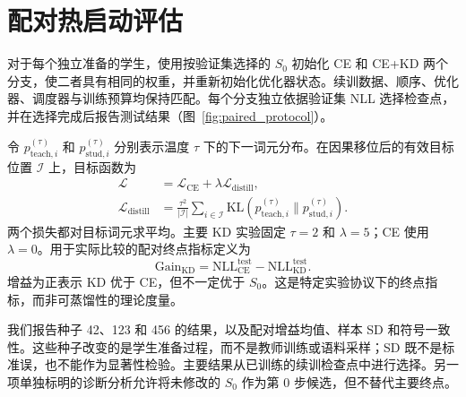\section{配对热启动评估}\label{sec:problem-setting}

对于每个独立准备的学生，使用按验证集选择的 $S_0$ 初始化 CE 和 CE+KD 两个分支，使二者具有相同的权重，并重新初始化优化器状态。续训数据、顺序、优化器、调度器与训练预算均保持匹配。每个分支独立依据验证集 NLL 选择检查点，并在选择完成后报告测试结果（图~\ref{fig:paired_protocol}）。

令 $p_{\mathrm{teach},i}^{(\tau)}$ 和 $p_{\mathrm{stud},i}^{(\tau)}$ 分别表示温度 $\tau$ 下的下一词元分布。在因果移位后的有效目标位置 $\mathcal I$ 上，目标函数为
\begin{align}
\mathcal L&=\mathcal L_{\mathrm{CE}}+\lambda\mathcal L_{\mathrm{distill}},\label{eq:kd-objective}\\
\mathcal L_{\mathrm{distill}}&=\frac{\tau^2}{|\mathcal I|}\sum_{i\in\mathcal I}
\mathrm{KL}\!\left(p_{\mathrm{teach},i}^{(\tau)}\|p_{\mathrm{stud},i}^{(\tau)}\right).\nonumber
\end{align}
两个损失都对目标词元求平均。主要 KD 实验固定 $\tau=2$ 和 $\lambda=5$；CE 使用 $\lambda=0$。用于实际比较的配对终点指标定义为
\begin{equation}
\mathrm{Gain}_{\mathrm{KD}}=\mathrm{NLL}_{\mathrm{CE}}^{\mathrm{test}}-\mathrm{NLL}_{\mathrm{KD}}^{\mathrm{test}}.
\label{eq:paired-gain}
\end{equation}
增益为正表示 KD 优于 CE，但不一定优于 $S_0$。这是特定实验协议下的终点指标，而非可蒸馏性的理论度量。

我们报告种子 42、123 和 456 的结果，以及配对增益均值、样本 SD 和符号一致性。这些种子改变的是学生准备过程，而不是教师训练或语料采样；SD 既不是标准误，也不能作为显著性检验。主要结果从已训练的续训检查点中进行选择。另一项单独标明的诊断分析允许将未修改的 $S_0$ 作为第 0 步候选，但不替代主要终点。
